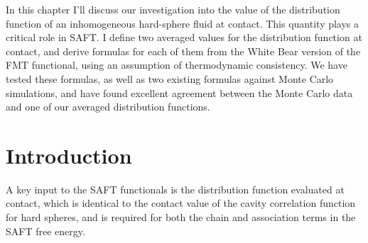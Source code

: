 \newcommand{\red}[1]{{\bf \color{red} #1}}
\newcommand{\blue}[1]{{\bf \color{blue} #1}}
\newcommand{\green}[1]{{\bf \color{green} #1}}
\newcommand{\refnote}{\red{[ref]}}

\newcommand{\derivation}[1]{} %

\newcommand{\needsworklater}[1]{\emph{[#1]}}
\newcommand{\needsworknow}[1]{\textcolor{red}{[\emph{#1}]}}
In this chapter I'll discuss our investigation into the value of the
distribution function of an inhomogeneous hard-sphere fluid at
contact.  This quantity plays a critical role in SAFT.  I define two
averaged values for the distribution function at contact, and derive
formulas for each of them from the White Bear version of the FMT
functional, using an assumption of thermodynamic consistency. We have
tested these formulas, as well as two existing formulas against Monte
Carlo simulations, and have found excellent agreement between the Monte
Carlo data and one of our averaged distribution functions.

\section{Introduction}


A key input to the SAFT functionals is the distribution function
evaluated at contact, which is identical to the contact value of the
cavity correlation function for hard spheres, and is required for both
the chain and association terms in the SAFT free energy.


